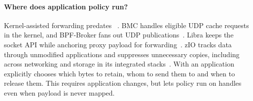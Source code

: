 \paragraph{Where does application policy run?} Kernel-assisted forwarding
predates \sys~\cite{rosu03}. BMC handles eligible UDP cache requests in the
kernel, and BPF-Broker fans out UDP publications~\cite{bmc,bpfbroker}. Libra
keeps the socket API while anchoring proxy payload for forwarding~\cite{libra}.
zIO tracks data through unmodified applications and suppresses unnecessary
copies, including across networking and storage in its integrated
stacks~\cite{zio}. With \sys an application explicitly chooses which bytes to
retain, whom to send them to and when to release them. This requires application
changes, but lets policy run on handles even when payload is never mapped.
